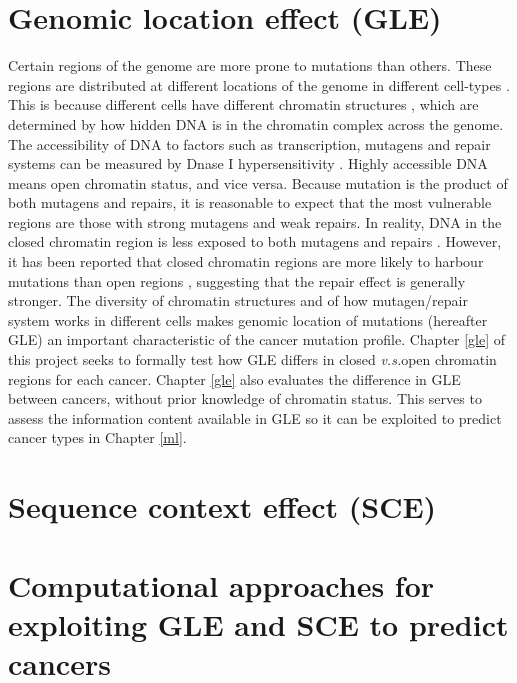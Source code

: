 \section{Genomic location effect (GLE)}
\label{intro:gle}
Certain regions of the genome are more prone to mutations than others. These regions are distributed at different locations of the genome in different cell-types \citep{Polak2015}. This is because different cells have different chromatin structures \citep{Abascal2020ExpandedGenomes}, which are determined by how hidden DNA is in the chromatin complex across the genome. The accessibility of DNA to factors such as transcription, mutagens and repair systems can be measured by Dnase I hypersensitivity \citep[DHS;][]{Liu2019AApplications}. Highly accessible DNA means open chromatin status, and vice versa. Because mutation is the product of both \glspl{mutagen} and repairs, it is reasonable to expect that the most vulnerable regions are those with strong mutagens and weak repairs. In reality, DNA in the closed chromatin region is less exposed to both mutagens and repairs \citep[Figure \ref][]{Teng1997ExcisionSequences, Morse2002PhotoreactivationCerevisiae}. However, it has been reported that closed chromatin regions are more likely to harbour mutations than open regions \citep{Polak2015,Prendergast2007ChromatinGenome}, suggesting that the repair effect is generally stronger. The diversity of chromatin structures and of how mutagen/repair system works in different cells makes genomic location of mutations (hereafter GLE) an important characteristic of the cancer mutation profile. Chapter \ref{gle} of this project seeks to formally test how GLE differs in closed \textit{v.s.}open chromatin regions for each cancer. Chapter \ref{gle} also evaluates the difference in GLE between cancers, without prior knowledge of chromatin status. This serves to assess the information content available in GLE so it can be exploited to predict cancer types in Chapter \ref{ml}.



\section{Sequence context effect (SCE)}
\label{intro:sce}
\section{Computational approaches for exploiting GLE and SCE to predict cancers}
\label{intro:ml}